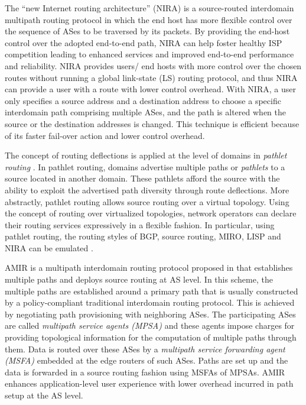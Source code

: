\documentclass[10pt]{IEEEtran}
\begin{document}
The ``new Internet routing architecture'' (NIRA) \cite{yang2007nira} is a source-routed interdomain multipath routing protocol in which the end host has more flexible control over the sequence of ASes to be traversed by its packets. By providing the end-host control over the adopted end-to-end path, NIRA can help foster healthy ISP competition leading to enhanced services and improved end-to-end performance and reliability. NIRA provides users/ end hosts with more control over the chosen routes without running a global link-state (LS) routing protocol, and thus NIRA can provide a user with a route with lower control overhead. With NIRA, a user only specifies a source address and a destination address to choose a specific interdomain path comprising multiple ASes, and the path is altered when the source or the destination addresses is changed. This technique is efficient because of its faster fail-over action and lower control overhead.

The concept of routing deflections \cite{yang2006source} is applied at the level of domains in \textit{pathlet routing} \cite{godfrey2009pathlet}. In pathlet routing, domains advertise multiple paths or \textit{pathlets} to a source located in another domain. These pathlets afford the source with the ability to exploit the advertised path diversity through route deflections. More abstractly, pathlet routing allows source routing over a virtual topology. Using the concept of routing over virtualized topologies, network operators can declare their routing services expressively in a flexible fashion. In particular, using pathlet routing, the routing styles of BGP, source routing, MIRO, LISP and NIRA can be emulated \cite{godfrey2009pathlet}.

AMIR is a multipath interdomain routing protocol proposed in \cite{qin2012amir} that establishes multiple paths and deploys source routing at AS level. In this scheme, the multiple paths are established around a primary path that is usually constructed by a policy-compliant traditional interdomain routing protocol. This is achieved by negotiating path provisioning with neighboring ASes. The participating ASes are called \textit{multipath service agents (MPSA)} and these agents impose charges for providing topological information for the computation of multiple paths through them. Data is routed over these ASes by a \textit{multipath service forwarding agent (MSFA)} embedded at the edge routers of such ASes. Paths are set up and the data is forwarded in a source routing fashion using MSFAs of MPSAs. AMIR enhances application-level user experience with lower overhead incurred in path setup at the AS level.
\end{document}
